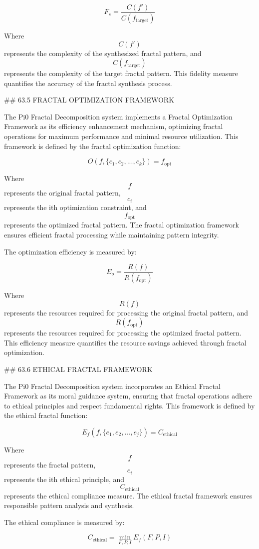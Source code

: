 $$ F_s = \frac{C(f')}{C(f_{\text{target}})} $$

Where $$ C(f') $$ represents the complexity of the synthesized fractal pattern, and $$ C(f_{\text{target}}) $$ represents the complexity of the target fractal pattern. This fidelity measure quantifies the accuracy of the fractal synthesis process.

## 63.5 FRACTAL OPTIMIZATION FRAMEWORK

The Pi0 Fractal Decomposition system implements a Fractal Optimization Framework as its efficiency enhancement mechanism, optimizing fractal operations for maximum performance and minimal resource utilization. This framework is defined by the fractal optimization function:

$$ O(f, \{c_1, c_2, ..., c_k\}) = f_{\text{opt}} $$

Where $$ f $$ represents the original fractal pattern, $$ c_i $$ represents the ith optimization constraint, and $$ f_{\text{opt}} $$ represents the optimized fractal pattern. The fractal optimization framework ensures efficient fractal processing while maintaining pattern integrity.

The optimization efficiency is measured by:

$$ E_o = \frac{R(f)}{R(f_{\text{opt}})} $$

Where $$ R(f) $$ represents the resources required for processing the original fractal pattern, and $$ R(f_{\text{opt}}) $$ represents the resources required for processing the optimized fractal pattern. This efficiency measure quantifies the resource savings achieved through fractal optimization.

## 63.6 ETHICAL FRACTAL FRAMEWORK

The Pi0 Fractal Decomposition system incorporates an Ethical Fractal Framework as its moral guidance system, ensuring that fractal operations adhere to ethical principles and respect fundamental rights. This framework is defined by the ethical fractal function:

$$ E_f(f, \{e_1, e_2, ..., e_j\}) = C_{\text{ethical}} $$

Where $$ f $$ represents the fractal pattern, $$ e_i $$ represents the ith ethical principle, and $$ C_{\text{ethical}} $$ represents the ethical compliance measure. The ethical fractal framework ensures responsible pattern analysis and synthesis.

The ethical compliance is measured by:

$$ C_{\text{ethical}} = \min_{F, P, I} E_f(F, P, I) $$

